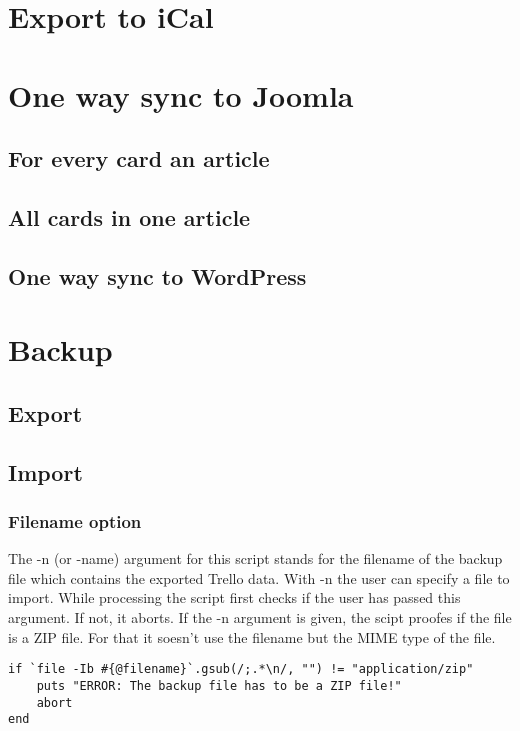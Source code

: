 \section{Export to iCal}

\section{One way sync to Joomla}

\subsection{For every card an article}

\subsection{All cards in one article}

\subsection{One way sync to WordPress}

\section{Backup}

\subsection{Export}

\subsection{Import}

\subsubsection{Filename option}
The -n (or -name) argument for this script stands for the filename of the backup file which contains the  exported Trello data. With -n the user can specify a file to import. While processing the script first checks if the user has passed this argument. If not, it aborts. If the -n argument is given, the scipt proofes if the file is a ZIP file. For that it soesn't use the filename but the MIME type of the file.

\begin{lstlisting}[float=htb, caption=Checking if the file has the MIME type \textquotedblleft application/zip\textquotedblright, label=listing008]
if `file -Ib #{@filename}`.gsub(/;.*\n/, "") != "application/zip"
	puts "ERROR: The backup file has to be a ZIP file!"
	abort
end
\end{lstlisting}

